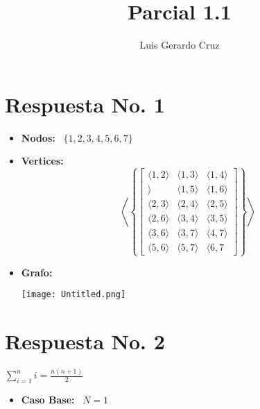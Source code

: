 \documentclass[10pt,a4paper]{article}
\begin{document}
\author{Luis Gerardo Cruz}\large
\title{Parcial 1.1}
\maketitle
\section*{Respuesta No. 1}
\begin{itemize}
\item \textbf{Nodos: } \ $ \lbrace 1,2,3,4,5,6,7 \rbrace$
\item \textbf{Vertices: }
$$
        \left\langle \left\{
            \begin{bmatrix}
                \langle 1,2 \rangle & \langle 1, 3\rangle & \langle 1,4 \rangle \\
                \rangle & \langle 1,5 \rangle & \langle 1,6 \rangle \\
                \langle 2,3 \rangle & \langle 2,4 \rangle & \langle 2,5 \rangle \\
                \langle 2,6 \rangle & \langle 3,4 \rangle & \langle 3,5 \rangle \\
                \langle 3,6 \rangle & \langle 3,7 \rangle & \langle 4,7 \rangle \\
                \langle 5,6 \rangle & \langle 5,7 \rangle & \langle 6,7
            \end{bmatrix}
        \right\}  \right\rangle
    $$ 
\item \textbf{Grafo: }
\begin{center}
\texttt{[image: Untitled.png]}  
\end{center}
\end{itemize}
\section*{Respuesta No. 2}
\begin{center}
$ \sum_{i=1}^{n}{i}=\frac{n(n+1)}{2} $
\end{center}
\begin{itemize}
\item\textbf{Caso Base: } \ $ N = 1 $
\end{itemize}
\end{document}

